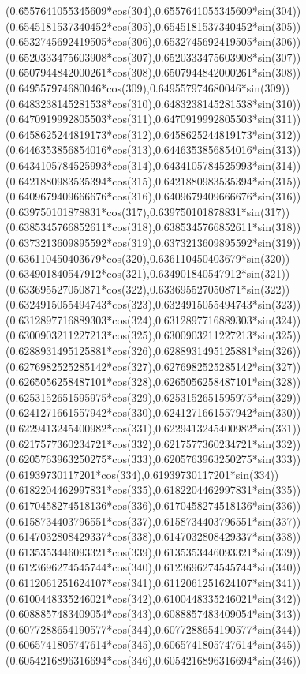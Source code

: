 {({0.6557641055345609*cos(304)},{0.6557641055345609*sin(304)})
({0.6545181537340452*cos(305)},{0.6545181537340452*sin(305)})
({0.6532745692419505*cos(306)},{0.6532745692419505*sin(306)})
({0.6520333475603908*cos(307)},{0.6520333475603908*sin(307)})
({0.6507944842000261*cos(308)},{0.6507944842000261*sin(308)})
({0.649557974680046*cos(309)},{0.649557974680046*sin(309)})
({0.6483238145281538*cos(310)},{0.6483238145281538*sin(310)})
({0.6470919992805503*cos(311)},{0.6470919992805503*sin(311)})
({0.6458625244819173*cos(312)},{0.6458625244819173*sin(312)})
({0.6446353856854016*cos(313)},{0.6446353856854016*sin(313)})
({0.6434105784525993*cos(314)},{0.6434105784525993*sin(314)})
({0.6421880983535394*cos(315)},{0.6421880983535394*sin(315)})
({0.6409679409666676*cos(316)},{0.6409679409666676*sin(316)})
({0.639750101878831*cos(317)},{0.639750101878831*sin(317)})
({0.6385345766852611*cos(318)},{0.6385345766852611*sin(318)})
({0.6373213609895592*cos(319)},{0.6373213609895592*sin(319)})
({0.636110450403679*cos(320)},{0.636110450403679*sin(320)})
({0.634901840547912*cos(321)},{0.634901840547912*sin(321)})
({0.633695527050871*cos(322)},{0.633695527050871*sin(322)})
({0.6324915055494743*cos(323)},{0.6324915055494743*sin(323)})
({0.6312897716889303*cos(324)},{0.6312897716889303*sin(324)})
({0.6300903211227213*cos(325)},{0.6300903211227213*sin(325)})
({0.6288931495125881*cos(326)},{0.6288931495125881*sin(326)})
({0.6276982525285142*cos(327)},{0.6276982525285142*sin(327)})
({0.6265056258487101*cos(328)},{0.6265056258487101*sin(328)})
({0.6253152651595975*cos(329)},{0.6253152651595975*sin(329)})
({0.6241271661557942*cos(330)},{0.6241271661557942*sin(330)})
({0.6229413245400982*cos(331)},{0.6229413245400982*sin(331)})
({0.6217577360234721*cos(332)},{0.6217577360234721*sin(332)})
({0.6205763963250275*cos(333)},{0.6205763963250275*sin(333)})
({0.61939730117201*cos(334)},{0.61939730117201*sin(334)})
({0.6182204462997831*cos(335)},{0.6182204462997831*sin(335)})
({0.6170458274518136*cos(336)},{0.6170458274518136*sin(336)})
({0.6158734403796551*cos(337)},{0.6158734403796551*sin(337)})
({0.6147032808429337*cos(338)},{0.6147032808429337*sin(338)})
({0.6135353446093321*cos(339)},{0.6135353446093321*sin(339)})
({0.6123696274545744*cos(340)},{0.6123696274545744*sin(340)})
({0.6112061251624107*cos(341)},{0.6112061251624107*sin(341)})
({0.6100448335246021*cos(342)},{0.6100448335246021*sin(342)})
({0.6088857483409054*cos(343)},{0.6088857483409054*sin(343)})
({0.6077288654190577*cos(344)},{0.6077288654190577*sin(344)})
({0.6065741805747614*cos(345)},{0.6065741805747614*sin(345)})
({0.6054216896316694*cos(346)},{0.6054216896316694*sin(346)})
}

